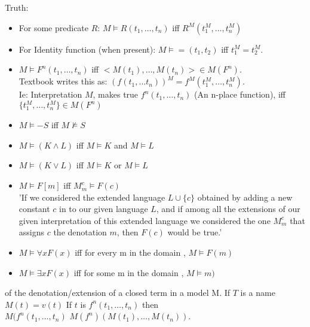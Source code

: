 \begin{definition}Truth: \\
\begin{itemize}
\item For some predicate $R$: $M \vDash R(t_1,\dots,t_n)$ iff $R^M(t_1^M,\dots,t_n^M)$ 
\item For Identity function (when present): $M \vDash =(t_1,t_2)$ iff $t_1^M = t_2^M$.
\item $M \vDash F^n (t_1,\dots,t_n)$ iff $<M(t_1),\dots,M(t_n)> \in M(F^n)$. \\
Textbook writes this as: $(f(t_1, \dots t_n))^M = f^M (t_1^M , \dots, t_n^M)$.
\\ Ie: Interpretation $M$, makes true $f^n(t_1,\dots,t_n)$ (An n-place function), iff $\{t_1^M , \dots, t_n^M\} \in M(F^n)$ %
\item $M \vDash -S $ iff $M \not \vDash S$ %
\item $M \vDash (K \wedge L )$ iff $M \vDash K$ and $M \vDash L$ 
\item $M \vDash (K \vee L )$ iff $M \vDash K$ or $M \vDash L$ %
\item $M \vDash F[m]$ iff $M^c_m \vDash F(c)$ \\
'If we considered the extended language $L \cup \{c\}$ obtained by adding a new constant $c$ in to our given language $L$, and if among all the extensions of our given interpretation of this extended language we considered the one $M^c_m$ that assigns $c$ the denotation $m$, then $F(c)$ would be true.'

\item $M \vDash \forall x F (x) $ iff for every m in the domain , $M \vDash F(m)$
\item $M \vDash \exists x F (x) $ iff for some m in the domain , $M \vDash m)$

\end{itemize}
\end{definition}

\begin{definition}
of the denotation/extension of a closed term in a model M.
If $T$ is a name $M(t) = v(t)$
If $t$ is $f^n(t_1,\dots,t_n)$
then \\
$M(f^n(t_1,\dots,t_n)$
$M(f^n)(M(t_1),\dots,M(t_n)).$
\end{definition}

